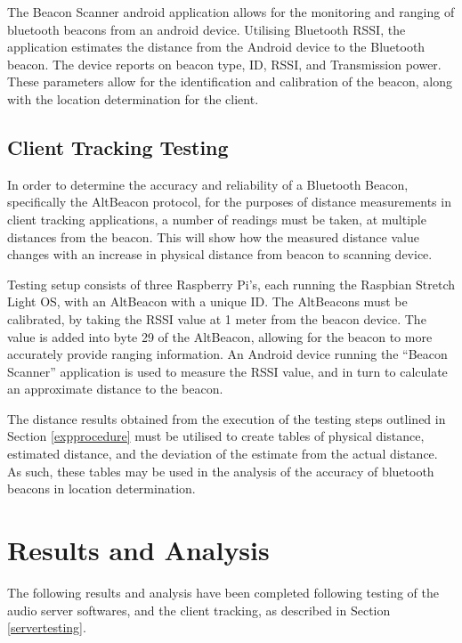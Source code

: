 \documentclass[11pt,a4paper,headinclude=false,footinclude=false]{scrreprt}
\begin{document}
The Beacon Scanner android application allows for the monitoring and
ranging of bluetooth beacons from an android device\cite{beaconscan}.
Utilising Bluetooth RSSI, the application estimates the distance from
the Android device to the Bluetooth beacon. The device reports on beacon
type, ID, RSSI, and Transmission power. These parameters allow for the
identification and calibration of the beacon, along with the location
determination for the client.

\section{Client Tracking Testing}\label{client-tracking-testing}

In order to determine the accuracy and reliability of a Bluetooth
Beacon, specifically the AltBeacon protocol, for the purposes of
distance measurements in client tracking applications, a number of
readings must be taken, at multiple distances from the beacon. This will
show how the measured distance value changes with an increase in
physical distance from beacon to scanning device.

Testing setup consists of three Raspberry Pi's, each running the
Raspbian Stretch Light OS, with an AltBeacon with a unique ID. The
AltBeacons must be calibrated, by taking the RSSI value at 1 meter from
the beacon device. The value is added into byte 29 of the AltBeacon,
allowing for the beacon to more accurately provide ranging information.
An Android device running the ``Beacon Scanner'' application is used to
measure the RSSI value, and in turn to calculate an approximate distance
to the beacon.

The distance results obtained from the execution of the testing steps
outlined in Section \ref{expprocedure} must be utilised to create tables
of physical distance, estimated distance, and the deviation of the
estimate from the actual distance. As such, these tables may be used in
the analysis of the accuracy of bluetooth beacons in location
determination.

\chapter{Results and Analysis}\label{results-and-analysis}

The following results and analysis have been completed following testing
of the audio server softwares, and the client tracking, as described in
Section \ref{servertesting}.
\end{document}
